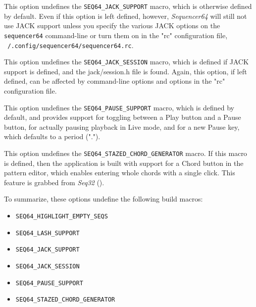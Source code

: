         This option undefines the \texttt{SEQ64\_JACK\_SUPPORT} macro, which is
        otherwise defined by default.  Even if this option is left defined,
        however, \textsl{Sequencer64} will still not use JACK support unless
        you specify the various JACK options on the \texttt{sequencer64}
        command-line or turn them on in the "rc" configuration file,
        \texttt{~/.config/sequencer64/sequencer64.rc}.

        This option undefines the \texttt{SEQ64\_JACK\_SESSION} macro, which is
        defined if JACK support is defined, and the jack/session.h file is
        found.  Again, this option, if left defined, can be affected by
        command-line options and options in the "rc" configuration file.

        This option undefines the \texttt{SEQ64\_PAUSE\_SUPPORT} macro,
        which is defined by default, and provides support for toggling between
        a Play button and a Pause button, for actually pausing playback
        in Live mode, and for a new Pause key, which defaults to a
        period (".").

        This option undefines the \texttt{SEQ64\_STAZED\_CHORD\_GENERATOR}
        macro.  If this macro is defined,
        then the application is built with support for a Chord button in the
        pattern editor, which enables entering whole chords with a single
        click.  This feature is grabbed from \textsl{Seq32} (\cite{seq32}).

    To summarize, these options undefine the following build macros:

      \begin{itemize}
        \item \texttt{SEQ64\_HIGHLIGHT\_EMPTY\_SEQS}
        \item \texttt{SEQ64\_LASH\_SUPPORT}
        \item \texttt{SEQ64\_JACK\_SUPPORT}
        \item \texttt{SEQ64\_JACK\_SESSION}
        \item \texttt{SEQ64\_PAUSE\_SUPPORT}
        \item \texttt{SEQ64\_STAZED\_CHORD\_GENERATOR}
      \end{itemize}

